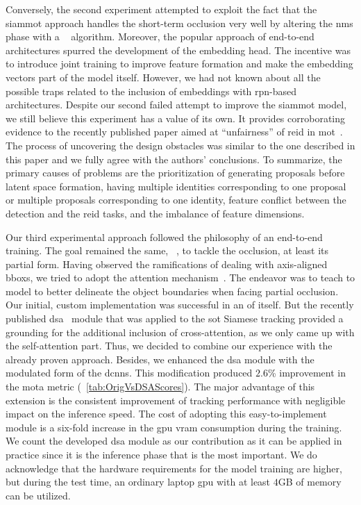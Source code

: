 Conversely, the second experiment attempted to exploit the fact that the \gls{siammot} approach handles the short-term occlusion very well by altering the \gls{nms} phase with a \featurenms{}~\cite{salscheider2020featurenms} algorithm. Moreover, the popular approach of end-to-end architectures spurred the development of the embedding head. The incentive was to introduce joint training to improve feature formation and make the embedding vectors part of the model itself. However, we had not known about all the possible traps related to the inclusion of embeddings with \gls{rpn}-based architectures. Despite our second failed attempt to improve the \gls{siammot} model, we still believe this experiment has a value of its own. It provides corroborating evidence to the recently published paper aimed at ``unfairness'' of \gls{reid} in \gls{mot}~\cite{zhang2021fairmot}. The process of uncovering the design obstacles was similar to the one described in this paper and we fully agree with the authors' conclusions. To summarize, the primary causes of problems are the prioritization of generating proposals before latent space formation, having multiple identities corresponding to one proposal or multiple proposals corresponding to one identity, feature conflict between the detection and the \gls{reid} tasks, and the imbalance of feature dimensions.

Our third experimental approach followed the philosophy of an end-to-end training. The goal remained the same, \ietext{}~, to tackle the occlusion, at least its partial form. Having observed the ramifications of dealing with axis-aligned \glspl{bbox}, we tried to adopt the attention mechanism~\cite{vaswani2017attention}. The endeavor was to teach to model to better delineate the object boundaries when facing partial occlusion. Our initial, custom implementation was successful in an of itself. But the recently published \gls{dsa}~\cite{yu2021dsa} module that was applied to the \gls{sot} Siamese tracking provided a grounding for the additional inclusion of cross-attention, as we only came up with the self-attention part. Thus, we decided to combine our experience with the already proven approach. Besides, we enhanced the \gls{dsa} module with the modulated form of the \glspl{dcnn}. This modification produced $2.6$\% improvement in the \gls{mota} metric (\tabletext{}~\ref{tab:OrigVsDSAScores}). The major advantage of this extension is the consistent improvement of tracking performance with negligible impact on the inference speed. The cost of adopting this easy-to-implement module is a six-fold increase in the \gls{gpu} \gls{vram} consumption during the training. We count the developed \gls{dsa} module as our contribution as it can be applied in practice since it is the inference phase that is the most important. We do acknowledge that the hardware requirements for the model training are higher, but during the test time, an ordinary laptop \gls{gpu} with at least $4$GB of memory can be utilized.

